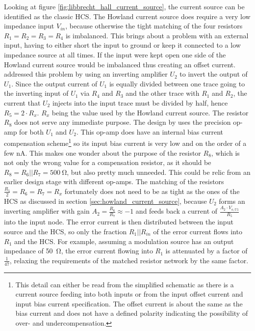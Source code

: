 Looking at figure \ref{fig:libbrecht_hall_current_source}, the current source can be identified as the classic HCS. The Howland current source does require a very low impedance input $V_{in}$, because otherwise the tight matching of the four resistors $R_1 = R_2 = R_3 = R_4$ is imbalanced. This brings about a problem with an external input, having to either short the input to ground or keep it connected to a low impedance source at all times. If the input were kept open one side of the Howland current source would be imbalanced thus creating an offset current. \citeauthor{libbrecht_hall} addressed this problem by using an inverting amplifier $U_2$ to invert the output of $U_1$. Since the output current of $U_1$ is equally divided between one trace going to the inverting input of $U_1$ via $R_4$ and $R_3$ and the other trace with $R_1$ and $R_2$, the current that $U_2$ injects into the input trace must be divided by half, hence $R_5 = 2 \cdot R_x$. $R_x$ being the value used by the Howland current source. The resistor $R_8$ does not serve any immediate purpose. The design by \citeauthor{libbrecht_hall} uses the  \cite{datasheet_OP07} precision op-amp for both $U_1$ and $U_2$. This op-amp does have an internal bias current compensation scheme\footnote{This detail can either be read from the simplified schematic as there is a current source feeding into both inputs or from the input offset current and input bias current specification. The offset current is about the same as the bias current and does not have a defined polarity indicating the possibility of over- and undercompensation.} so its input bias current is very low and on the order of a few \unit{\nA}. This makes one wonder about the purpose of the resistor $R_8$, which is not only the wrong value for a compensation resistor, as it should be $R_8 = R_6 || R_7 = \qty{500}{\ohm}$, but also pretty much unneeded. This could be relic from an earlier design stage with different op-amps. The matching of the resistors $\frac{R_5}{2} = R_6 = R_7 = R_x$ fortunately does not need to be as tight as the ones of the HCS as discussed in section \ref{sec:howland_current_source}, because $U_2$ forms an inverting amplifier with gain $A_2 = \frac{R_6}{R_7} \approx -1$ and feeds back a current of $\frac{A_2 \cdot V_{o,U1}}{R_5}$ into the input node. The error current is then distributed between the input source and the HCS, so only the fraction $R_1 || R_{in}$ of the error current flows into $R_1$ and the HCS. For example, assuming a modulation source has an output impedance of \qty{50}{\ohm}, the error current flowing into $R_1$ is attenuated by a factor of $\frac{1}{47}$, relaxing the requirements of the matched resistor network by the same factor.

